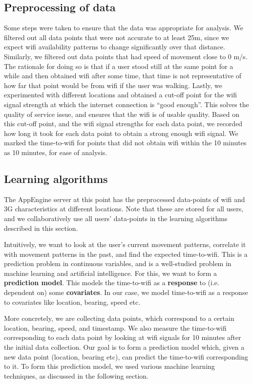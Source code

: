 \documentclass[12pt, fleqn]{article}
\begin{document}
\subsection{Preprocessing of data}

Some steps were taken to ensure that the data was appropriate for analysis. We filtered
out all data points that were not accurate to at least 25m, since we expect wifi availability 
patterns to change significantly over that distance. Similarly, we filtered out data points that 
had speed of movement close to 0 m/s. The rationale for doing so is that if a user stood 
still at the same point for a while and then obtained wifi after some time, that time is not 
representative of how far that point would be from wifi if the user was walking. Lastly, we 
experimented with different locations and obtained a cut-off point for the wifi signal 
strength at which the internet connection is “good enough”. This solves the 
quality of service issue, and ensures that the wifi is of usable quality. Based on this cut-off point, 
and the wifi signal strengths for each data point, we recorded how long it took for each 
data point to obtain a strong enough wifi signal. We marked the time-to-wifi for points 
that did not obtain wifi within the 10 minutes as 10 minutes, for ease of analysis.

\subsection{Learning algorithms} 
\label{time-to-wifi-learning-algorithms}

The AppEngine server at this point has the preprocessed data-points of wifi and 3G 
characteristics at different locations. Note that these are stored 
for all users, and we collaboratively use all users' data-points in the 
learning algorithms described in this section. 

Intuitively, we want to look at the user's current movement patterns, 
correlate it with movement patterns in the past, and find the expected 
time-to-wifi. This is a prediction problem in continuous variables, and is a 
well-studied problem in machine learning and artificial intelligence. 
For this, we want to form a \textbf{prediction model}. This models 
the time-to-wifi as a \textbf{response} to (i.e. dependent on) some  
\textbf{covariates}. In our case, we model time-to-wifi as a response to 
covariates like location, bearing, speed etc. 

More concretely, we are collecting data points, which correspond to a certain 
location, bearing, speed, and timestamp. We also measure the time-to-wifi 
corresponding to each data point by looking at wifi signals for 10 minutes after 
the initial data collection. Our goal is to form a prediction model which, 
given a new data point (location, bearing etc), can predict the time-to-wifi corresponding to it. 
To form this prediction model, we used various machine learning techniques, as 
discussed in the following section. 
\end{document}
